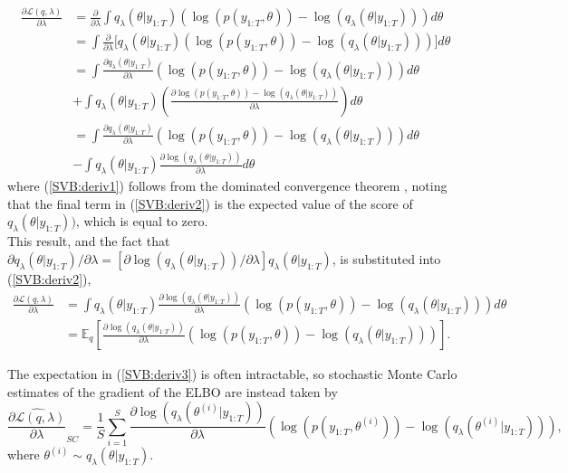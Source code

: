 \documentclass[
12pt, %
onehalfspacing, %
nohyperref, %
headsepline, %
chapterinoneline, %
]{MastersDoctoralThesis} %
\begin{document}
\begin{align}
\frac{\partial \mathcal{L}(q, \lambda)}{\partial \lambda} &= \frac{\partial}{\partial \lambda}\int q_{\lambda}(\theta | y_{1:T}) \left(\log(p(y_{1:T}, \theta)) - \log(q_{\lambda}(\theta | y_{1:T}))\right) d\theta \nonumber \\
&= \int  \frac{\partial}{\partial \lambda}\bigg[ q_{\lambda}(\theta | y_{1:T}) \left(\log(p(y_{1:T}, \theta)) - \log(q_{\lambda}(\theta | y_{1:T}))\right) \bigg] d\theta \label{SVB:deriv1} \\
&= \int \frac{\partial q_{\lambda}(\theta | y_{1:T})}{\partial \lambda}  \left(\log(p(y_{1:T}, \theta)) - \log(q_{\lambda}(\theta | y_{1:T}))\right) d\theta \nonumber \\
&+ \int q_{\lambda}(\theta | y_{1:T}) \left( \frac{\partial \log(p(y_{1:T}, \theta)) - \log(q_{\lambda}(\theta | y_{1:T}))}{\partial \lambda} \right) d\theta \nonumber \\
&= \int \frac{\partial q_{\lambda}(\theta | y_{1:T})}{\partial \lambda}  \left(\log(p(y_{1:T}, \theta)) - \log(q_{\lambda}(\theta | y_{1:T}))\right) d\theta \nonumber \\
&- \int q_{\lambda}(\theta | y_{1:T})\frac{\partial \log(q_{\lambda}(\theta | y_{1:T}))}{\partial \lambda} d\theta \label{SVB:deriv2}
\end{align}
where (\ref{SVB:deriv1}) follows from the dominated convergence theorem \citep{Casella2002}, noting that the final term in (\ref{SVB:deriv2}) is the expected value of the score of $q_{\lambda}(\theta | y_{1:T}))$, which is equal to zero. 
\\

This result, and the fact that $\partial q_{\lambda}(\theta | y_{1:T}) / \partial \lambda = \left[\partial \log(q_{\lambda}(\theta | y_{1:T})) / \partial \lambda \right] q_{\lambda}(\theta | y_{1:T})$, is substituted into (\ref{SVB:deriv2}),
\begin{align}
\frac{\partial \mathcal{L}(q, \lambda)}{\partial \lambda} &=  \int  q_{\lambda}(\theta | y_{1:T}) \frac{\partial \log(q_{\lambda}(\theta | y_{1:T}))}{\partial \lambda}  \left(\log(p(y_{1:T}, \theta)) - \log(q_{\lambda}(\theta | y_{1:T}))\right) d\theta \nonumber \\
&= \mathbb{E}_{q} \left[ \frac{\partial \log(q_{\lambda}(\theta | y_{1:T}))}{\partial \lambda}  \left(\log(p(y_{1:T}, \theta)) - \log(q_{\lambda}(\theta | y_{1:T}))\right) \right]. \label{SVB:deriv3}
\end{align}

The expectation in (\ref{SVB:deriv3}) is often intractable, so stochastic Monte Carlo estimates of the gradient of the ELBO are instead taken by
\begin{equation}
\label{SVB:scoreDeriv}
\widehat{\frac{\partial\mathcal{L}(q, \lambda)}{\partial \lambda}}_{SC} = \frac{1}{S} \sum_{i = 1}^S \frac{\partial \log(q_{\lambda}(\theta^{(i)} | y_{1:T}))}{\partial \lambda} \left(\log(p(y_{1:T}, \theta^{(i)})) - \log(q_{\lambda}(\theta^{(i)} | y_{1:T})) \right),
\end{equation}
where $\theta^{(i)} \sim q_{\lambda}(\theta | y_{1:T})$.
\\
\end{document}

